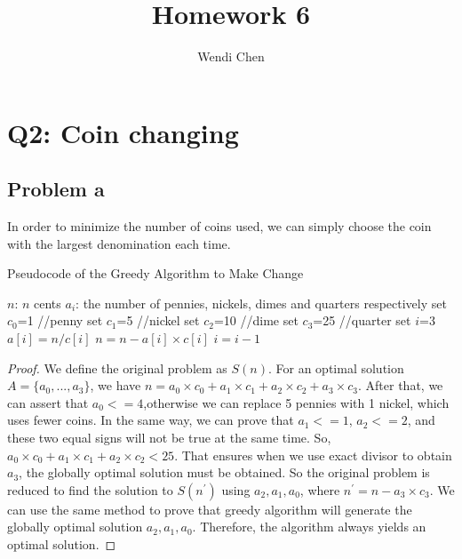 \documentclass[a4paper]{article}
\title{\textbf{Homework 6}}
\author{Wendi Chen}
\date{}
\newtheorem{proof}{Proof}[section]
\begin{document}
\maketitle

\section{Q2: Coin changing}
\subsection{Problem a}
In order to minimize the number of coins used,
 we can simply choose the coin with the largest denomination each time.
\renewcommand{\algorithmicrequire}{\textbf{Input:}}  %
\renewcommand{\algorithmicensure}{\textbf{Output:}} %
\begin{algorithm}[h]
    \caption{Pseudocode of the Greedy Algorithm to Make Change}
    \begin{algorithmic}[1]
        \Require
        $n$: $n$ cents
        \Ensure
        $a_i$: the number of pennies, nickels, dimes and quarters respectively
        \State set $c_0$=1 //penny
        \State set $c_1$=5 //nickel
        \State set $c_2$=10 //dime
        \State set $c_3$=25 //quarter
        \State set $i$=3
        \State$a[i] = n/c[i]$
        \State$n = n - a[i]\times c[i]$
        \State$i = i - 1$
        \EndWhile
    \end{algorithmic}
\end{algorithm}
\begin{proof}
    We define the original problem as $S(n)$. For an optimal solution $A=\{a_0,...,a_3\}$, we have $n = a_0\times c_0+a_1\times c_1+a_2\times c_2+a_3\times c_3$. 
    After that, we can assert that $a_0<=4$,otherwise we can replace 5 pennies with 1 nickel, which uses fewer coins. 
    In the same way, we can prove that $a_1<=1$, $a_2<=2$, and these two equal signs will not be true at the same time. 
    So, $a_0\times c_0+a_1\times c_1+a_2\times c_2<25$.
    That ensures when we use exact divisor to obtain $a_3$, the globally optimal solution must be obtained.
    So the original problem is reduced to find the solution to $S(n^{'})$ using $a_2,a_1,a_0$, where $n^{'} = n - a_3\times c_3$.
    We can use the same method to prove that greedy algorithm will generate the globally optimal solution $a_2,a_1,a_0$.
    Therefore, the algorithm always yields an optimal solution.
\end{proof}
\end{document}
